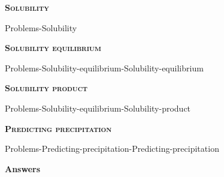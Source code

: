 \documentclass[main.tex]{subfiles}
\begin{document}
\newpage
 
\fancyhfoffset[E,O]{0pt}
\setlength{\columnsep}{30pt}
\begin{conclusion}
\end{conclusion}
\begin{multicols*}{2}\setcounter{numA}{1}
{\raggedright\textsc{\textbf{Solubility }}\par}
 {Problems-Solubility}
 
{\raggedright\textsc{\textbf{Solubility equilibrium}}\par}
 {Problems-Solubility-equilibrium-Solubility-equilibrium}

{\raggedright\textsc{\textbf{Solubility product}}\par}
 {Problems-Solubility-equilibrium-Solubility-product}
{\raggedright\textsc{\textbf{Predicting precipitation}}\par}
 {Problems-Predicting-precipitation-Predicting-precipitation}
 
 

\end{multicols*}

\newpage
\begin{answersenvironment}
\begin{minipage}[c]{1\textwidth}
\begin{localsize}{10}
{\Large \bf Answers}
\end{localsize}
\end{minipage}\end{answersenvironment}
\end{document}
